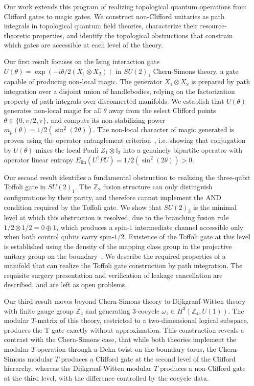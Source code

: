 \documentclass[12pt,a4paper]{article}
\begin{document}
Our work extends this program of realizing topological quantum operations from Clifford gates to magic gates. We construct non-Clifford unitaries as path integrals in topological quantum field theories, characterize their resource-theoretic properties, and identify the topological obstructions that constrain which gates are accessible at each level of the theory.

Our first result focuses on the Ising interaction gate $U(\theta) = \exp(-i\theta/2 (X_1 \otimes X_2))$ in $SU(2)_1$ Chern-Simons theory, a gate capable of producing non-local magic. The generator $X_1 \otimes X_2$ is prepared by path integration over a disjoint union of handlebodies, relying on the factorization property of path integrals over disconnected manifolds. We establish that $U(\theta)$ generates non-local magic for all $\theta$ away from the select Clifford points $\theta \in \{0, \pi/2, \pi\}$, and compute its non-stabilizing power $m_p(\theta) = 1/2(\sin^2(2\theta))$. The non-local character of magic generated is proven using the operator entanglement criterion~\cite{faidon:2026}, i.e. showing that conjugation by $U(\theta)$ mixes the local Pauli $Z_1 \otimes \mathbb{I}_2$ into a genuinely bipartite operator with operator linear entropy $E_{\mathrm{lin}}(U^\dagger P U) = 1/2(\sin^2(2\theta)) > 0$.

Our second result identifies a fundamental obstruction to realizing the three-qubit Toffoli gate in $SU(2)_1$. The $\mathbb{Z}_2$ fusion structure can only distinguish configurations by their parity, and therefore cannot implement the AND condition required by the Toffoli gate. We show that $SU(2)_3$ is the minimal level at which this obstruction is resolved, due to the  branching fusion rule $1/2 \otimes 1/2 = 0 \oplus 1$, which produces a spin-$1$ intermediate channel accessible only when both control qubits carry spin-$1/2$. Existence of the Toffoli gate at this level is established using the density of the mapping class group in the projective unitary group on the boundary~\cite{Freedman2003}. We describe the required properties of a manifold that can realize the Toffoli gate construction by path integration. The requisite surgery presentation and verification of leakage cancellation are described, and are left as open problems.

Our third result moves beyond Chern-Simons theory to Dijkgraaf-Witten theory~\cite{Dijkgraaf:1990} with finite gauge group $\mathbb{Z}_4$ and generating 3-cocycle $\omega_1 \in H^3(\mathbb{Z}_4, U(1))$. The modular $T$-matrix of this theory, restricted to a two-dimensional logical subspace, produces the T gate exactly without approximation. This construction reveals a contrast with the Chern-Simons case, that while both theories implement the modular $T$ operation through a Dehn twist on the boundary torus, the Chern-Simons modular $T$ produces a Clifford gate at the second level of the Clifford hierarchy, whereas the Dijkgraaf-Witten modular $T$ produces a non-Clifford gate at the third level, with the difference controlled by the cocycle data.
\end{document}
